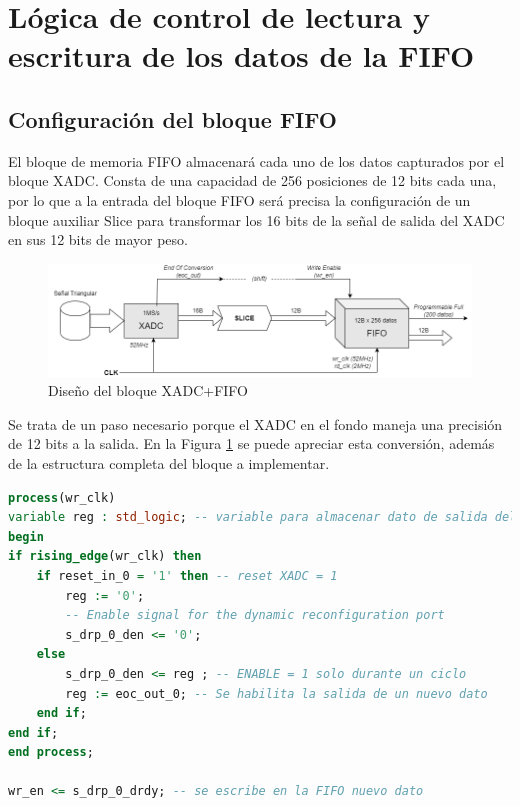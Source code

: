 \section{Lógica de control de lectura y escritura de los datos de la FIFO}

\subsection{Configuración del bloque FIFO}
\label{section:fifo}

El bloque de memoria FIFO almacenará cada uno de los datos capturados por el bloque XADC. Consta de una capacidad de 256 posiciones de 12 bits cada una, por lo que a la entrada del bloque FIFO será precisa la configuración de un bloque auxiliar Slice para transformar los 16 bits de la señal de salida del XADC en sus 12 bits de mayor peso. 

\vspace{3mm}

\begin{figure}[h]
    \centering
    \includegraphics[width=1\textwidth]{img/diseno/xadc_fifo.drawio.PNG}
    \caption{Diseño del bloque XADC+FIFO}
    \label{fig:xadc_fifo}
\end{figure}
    
\vspace{3mm}

Se trata de un paso necesario porque el XADC en el fondo maneja una precisión de 12 bits a la salida. En la Figura \ref*{fig:xadc_fifo} se puede apreciar esta conversión, además de la estructura completa del bloque a implementar.

\vspace{5mm}

\begin{lstlisting}[language=VHDL, style=mystyle, caption={Proceso de escritura}]
process(wr_clk) 
variable reg : std_logic; -- variable para almacenar dato de salida del xadc
begin
if rising_edge(wr_clk) then
    if reset_in_0 = '1' then -- reset XADC = 1
        reg := '0';
        -- Enable signal for the dynamic reconfiguration port
        s_drp_0_den <= '0'; 
    else
        s_drp_0_den <= reg ; -- ENABLE = 1 solo durante un ciclo
        reg := eoc_out_0; -- Se habilita la salida de un nuevo dato 
    end if;
end if;
end process; 

wr_en <= s_drp_0_drdy; -- se escribe en la FIFO nuevo dato 
\end{lstlisting}

